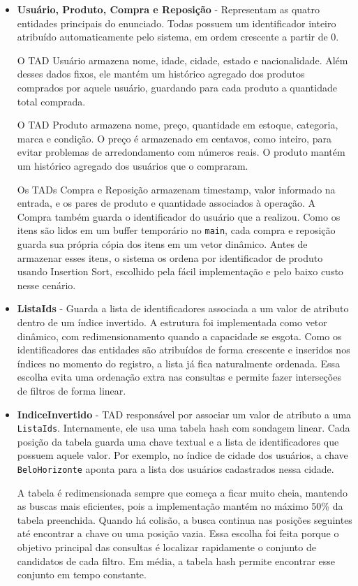 \documentclass[11pt,a4paper]{article}
\begin{document}
\begin{itemize}
    \item \textbf{Usuário, Produto, Compra e Reposição} - Representam as quatro entidades principais do enunciado. Todas possuem um identificador inteiro atribuído automaticamente pelo sistema, em ordem crescente a partir de 0.

    O TAD Usuário armazena nome, idade, cidade, estado e nacionalidade. Além desses dados fixos, ele mantém um histórico agregado dos produtos comprados por aquele usuário, guardando para cada produto a quantidade total comprada.

    O TAD Produto armazena nome, preço, quantidade em estoque, categoria, marca e condição. O preço é armazenado em centavos, como inteiro, para evitar problemas de arredondamento com números reais. O produto mantém um histórico agregado dos usuários que o compraram.

    Os TADs Compra e Reposição armazenam timestamp, valor informado na entrada, e os pares de produto e quantidade associados à operação. A Compra também guarda o identificador do usuário que a realizou. Como os itens são lidos em um buffer temporário no \texttt{main}, cada compra e reposição guarda sua própria cópia dos itens em um vetor dinâmico. Antes de armazenar esses itens, o sistema os ordena por identificador de produto usando Insertion Sort, escolhido pela fácil implementação e pelo baixo custo nesse cenário.

    \item \textbf{ListaIds} - Guarda a lista de identificadores associada a um valor de atributo dentro de um índice invertido. A estrutura foi implementada como vetor dinâmico, com redimensionamento quando a capacidade se esgota. Como os identificadores das entidades são atribuídos de forma crescente e inseridos nos índices no momento do registro, a lista já fica naturalmente ordenada. Essa escolha evita uma ordenação extra nas consultas e permite fazer interseções de filtros de forma linear.

    \item \textbf{IndiceInvertido} - TAD responsável por associar um valor de atributo a uma \texttt{ListaIds}. Internamente, ele usa uma tabela hash com sondagem linear. Cada posição da tabela guarda uma chave textual e a lista de identificadores que possuem aquele valor. Por exemplo, no índice de cidade dos usuários, a chave \texttt{BeloHorizonte} aponta para a lista dos usuários cadastrados nessa cidade.

    A tabela é redimensionada sempre que começa a ficar muito cheia, mantendo as buscas mais eficientes, pois a implementação mantém no máximo 50\% da tabela preenchida. Quando há colisão, a busca continua nas posições seguintes até encontrar a chave ou uma posição vazia. Essa escolha foi feita porque o objetivo principal das consultas é localizar rapidamente o conjunto de candidatos de cada filtro. Em média, a tabela hash permite encontrar esse conjunto em tempo constante.


\end{itemize}
\end{document}
